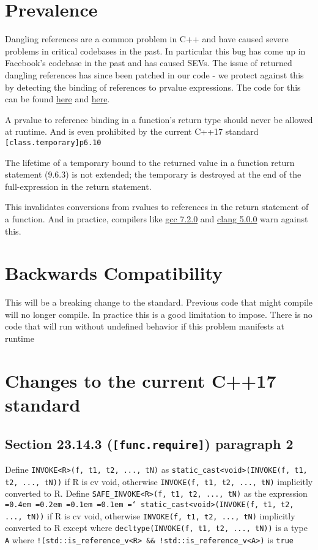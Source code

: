 \documentclass{article}
\newcommand*\justify{%
  \fontdimen2\font=0.4em%
  \fontdimen3\font=0.2em%
  \fontdimen4\font=0.1em%
  \fontdimen7\font=0.1em%
  \hyphenchar\font=`\-%
}
\begin{document}
\section{Prevalence}
Dangling references are a common problem in C++ and have caused severe
problems in critical codebases in the past.  In particular this bug has come
up in Facebook's codebase in the past and has caused SEVs.  The issue of
returned dangling references has since been patched in our code -
we protect against this by detecting the binding of references to prvalue
expressions.  The code for this can be found
\href{https://goo.gl/iyjDA9}{here} and \href{https://goo.gl/GAvi5j}{here}.

A prvalue to reference binding in a function's return type should never be
allowed at runtime.  And is even prohibited by the current C++17 standard
\texttt{[class.temporary]p6.10}
\begin{displayquote}
The lifetime of a temporary bound to the returned value in a function return
statement (9.6.3) is not extended; the temporary is destroyed at the end of
the full-expression in the return statement.
\end{displayquote}

This invalidates conversions from rvalues to references in the return
statement of a function.  And in practice, compilers like
\href{fucntio://wandbox.org/permlink/vRKLn2OoolPzeW44}{gcc 7.2.0} and
\href{https://wandbox.org/permlink/lOCOoY0qnSJwIQ8j}{clang 5.0.0} warn against
this.

\section{Backwards Compatibility}
This will be a breaking change to the standard.  Previous code that might
compile will no longer compile.  In practice this is a good limitation to
impose.  There is no code that will run without undefined behavior if this
problem manifests at runtime

\section{Changes to the current C++17 standard}
\subsection{Section 23.14.3 (\texttt{[func.require]}) paragraph 2}
Define \texttt{INVOKE<R>(f, t1, t2, ..., tN)} as
\texttt{static\_cast<void>(INVOKE(f, t1, t2, ..., tN))} if R is cv void,
otherwise \texttt{INVOKE(f, t1, t2, ..., tN)} implicitly converted to R.
Define \texttt{SAFE\_INVOKE<R>(f, t1, t2, ..., tN)} as the expression
\texttt{\justify static\_cast<void>(INVOKE(f, t1, t2, ..., tN))} if R is cv
void, otherwise \texttt{INVOKE(f, t1, t2, ..., tN)} implicitly converted to R
except where \texttt{decltype(INVOKE(f, t1, t2, ..., tN))} is a type
\texttt{A} where \texttt{!(std::is\_reference\_v<R> &&
!std::is\_reference\_v<A>)} is \texttt{true}
\end{document}
